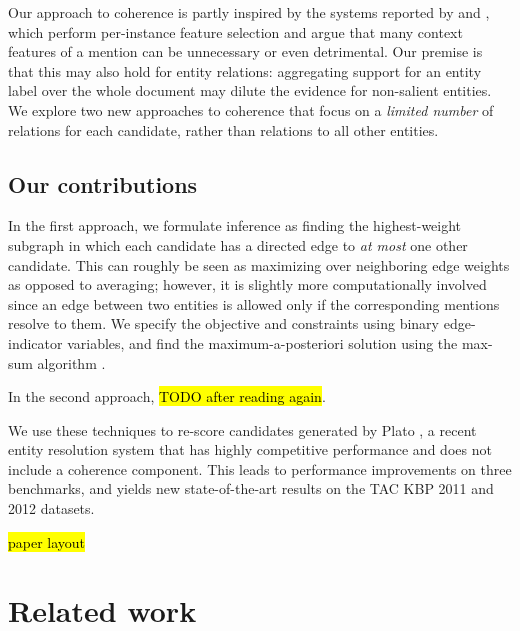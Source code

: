 Our approach to coherence is partly inspired by the systems reported by \cite{Jin:2014} and \cite{Lazic2015}, which perform per-instance feature selection and argue that many context features of a mention can be unnecessary or even detrimental. 
Our premise is that this may also hold for entity relations: aggregating support for an entity label over the whole document may dilute the evidence for non-salient entities. We explore two new approaches to coherence that focus on a \emph{limited number} of relations for each candidate, rather than relations to all other entities. 


\subsection{Our contributions}
\label{sec:intro:our}


In the first approach, we formulate inference as finding the highest-weight subgraph in which each candidate has a directed edge to \emph{at most} one other candidate. This can roughly be seen as maximizing over neighboring edge weights as opposed to averaging; however, it is slightly more computationally involved since an edge between two entities is allowed only if the corresponding mentions resolve to them. We specify the objective and constraints using binary edge-indicator variables, and find the maximum-a-posteriori solution using the max-sum algorithm \cite{Kschischang2001}. 

In the second approach, \hl{TODO after reading again}.  %

We use these techniques to re-score candidates generated by Plato \cite{Lazic2015}, a recent entity resolution system that has highly competitive performance and does not include a coherence component. This leads to performance improvements on three benchmarks, and yields new state-of-the-art results on the TAC KBP 2011 and 2012 datasets.

\hl{paper layout}


\section{Related work}
\label{sec:related}

